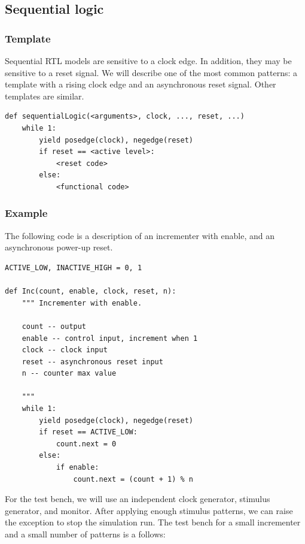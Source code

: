 \subsection{Sequential logic \label{model-seq}}

\subsubsection{Template \label{model-seq-templ}}
Sequential RTL models are sensitive to a clock edge. In addition, they
may be sensitive to a reset signal. We will describe one of the most
common patterns: a template with a rising clock edge and an
asynchronous reset signal. Other templates are similar.

\begin{verbatim}
def sequentialLogic(<arguments>, clock, ..., reset, ...)
    while 1:
        yield posedge(clock), negedge(reset)
        if reset == <active level>:
            <reset code>
        else:
            <functional code>
\end{verbatim}


\subsubsection{Example \label{model-seq-ex}}
The following code is a description of an incrementer with enable, and
an asynchronous power-up reset.

\begin{verbatim}
ACTIVE_LOW, INACTIVE_HIGH = 0, 1

def Inc(count, enable, clock, reset, n):
    """ Incrementer with enable.
    
    count -- output
    enable -- control input, increment when 1
    clock -- clock input
    reset -- asynchronous reset input
    n -- counter max value

    """
    while 1:
        yield posedge(clock), negedge(reset)
        if reset == ACTIVE_LOW:
            count.next = 0
        else:
            if enable:
                count.next = (count + 1) % n
\end{verbatim}

For the test bench, we will use an independent clock generator, stimulus
generator, and monitor. After applying enough stimulus patterns, we
can raise the  exception to stop the
simulation run. The test bench for a small incrementer and a small
number of patterns is a follows:

